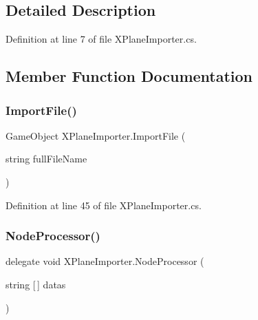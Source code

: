 \subsection{Detailed Description}


Definition at line 7 of file X\+Plane\+Importer.\+cs.



\subsection{Member Function Documentation}
\mbox{\label{class_x_plane_importer_a772fdc0a04e6ac2c4bb85cda64d85065}} 
\subsubsection{\texorpdfstring{ImportFile()}{ImportFile()}}
{\footnotesize\ttfamily Game\+Object X\+Plane\+Importer.\+Import\+File (\begin{DoxyParamCaption}\item[{string}]{full\+File\+Name }\end{DoxyParamCaption})}



Definition at line 45 of file X\+Plane\+Importer.\+cs.

\mbox{\label{class_x_plane_importer_a900a89814a40058c59e1f6c062bf724e}} 
\subsubsection{\texorpdfstring{NodeProcessor()}{NodeProcessor()}}
{\footnotesize\ttfamily delegate void X\+Plane\+Importer.\+Node\+Processor (\begin{DoxyParamCaption}\item[{string \mbox{[}$\,$\mbox{]}}]{datas }\end{DoxyParamCaption})}

\mbox{\label{class_x_plane_importer_afbcd75869e373a08dd6452cb385d0961}} 
